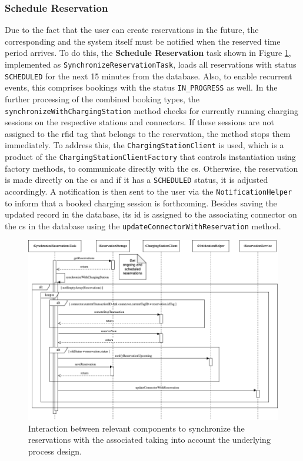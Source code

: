 \subsubsection{Schedule Reservation}
\label{ch:Implementation:sec:Reservation System:ssec:Scheduling Capabilities:sssec:Schedule Reservation}

Due to the fact that the user can create reservations in the future, the corresponding  and the system itself must be notified when the reserved time period arrives.
To do this, the \textbf{Schedule Reservation} task shown in Figure \ref{fig:schedule-reservation-seqflow}, implemented as \texttt{SynchronizeReservationTask}, loads all reservations with status \texttt{SCHEDULED} for the next 15 minutes from the database.
Also, to enable recurrent events, this comprises bookings with the status \texttt{IN\_PROGRESS} as well. 
In the further processing of the combined booking types, the \texttt{synchronizeWithChargingStation} method checks for currently running charging sessions on the respective stations and connectors. If these sessions are not assigned to the \acrshort{rfid} tag that belongs to the reservation, the method stops them immediately.
To address this, the \texttt{ChargingStationClient} is used, which is a product of the \texttt{ChargingStationClientFactory} that controls instantiation using factory methods, to communicate directly with the \acrshort{cs}.
Otherwise, the reservation is made directly on the \acrshort{cs} and if it has a \texttt{SCHEDULED} status, it is adjusted accordingly. A notification is then sent to the user via the \texttt{NotificationHelper} to inform that a booked charging session is forthcoming.
Besides saving the updated record in the database, its \acrshort{id} is assigned to the associating connector on the \acrshort{cs} in the database using the \texttt{updateConnectorWithReservation} method.

\begin{figure}[h]
    \centering
    \includegraphics[scale=0.4]{resources/images/main/6_implementation/processes/scheduler/SynchronizeReservation.png}
    \caption{Interaction between relevant components to synchronize the reservations with the associated  taking into account the underlying process design.}
    \label{fig:schedule-reservation-seqflow}
\end{figure}

